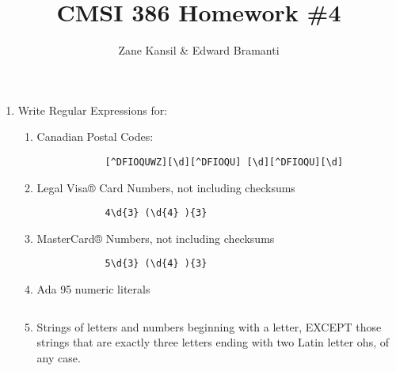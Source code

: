 \documentclass{article}
\title{CMSI 386 Homework \#4}
\author{Zane Kansil \& Edward Bramanti}
\begin{document}
\begin{enumerate}
\item Write Regular Expressions for: 
	\begin{enumerate}
		\item Canadian Postal Codes:
		\begin{verbatim}
			[^DFIOQUWZ][\d][^DFIOQU] [\d][^DFIOQU][\d]
		\end{verbatim}
		\item Legal Visa® Card Numbers, not including checksums
	    \begin{verbatim}
	        4\d{3} (\d{4} ){3}
	    \end{verbatim}
	    \item MasterCard® Numbers, not including checksums
	  	\begin{verbatim}
			5\d{3} (\d{4} ){3}
		\end{verbatim}
		\item Ada 95 numeric literals
		\begin{verbatim}

		\end{verbatim}
		\item Strings of letters and numbers beginning with a letter, EXCEPT those strings that are exactly three letters ending with two Latin letter ohs, of any case.
		\begin{verbatim}
		
		\end{verbatim}
	\end{enumerate}
\end{enumerate}
\end{document}
